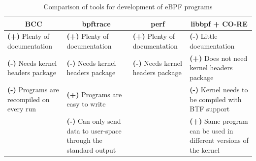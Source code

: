 \begin{table}[htb]
   \centering
   \caption{Comparison of tools for development of eBPF programs}\label{tab:comp}
   \begin{tabular}{|p{3.5cm}|p{3.5cm}|p{3.5cm}|p{3.5cm}|}
      \hline
      \multicolumn{1}{|c|}{\textbf{BCC}} &
        \multicolumn{1}{c|}{\textbf{bpftrace}} &
        \multicolumn{1}{c|}{\textbf{perf}} & \multicolumn{1}{c|}{\textbf{libbpf
        + CO-RE}} \\
      \hline
      \textbf{(+)} Plenty of \newline documentation & \textbf{(+)} Plenty of
        \newline documentation & \textbf{(+)} Plenty of \newline documentation &
        \textbf{(-)} Little \newline documentation \\
      \hline
      \textbf{(-)} Needs kernel \newline headers package & \textbf{(-)} Needs
        kernel \newline headers package & \textbf{(-)} Needs kernel \newline
        headers package & \textbf{(+)} Does not need \newline kernel headers
        \newline package \\
      \hline
      \textbf{(-)} Programs are \newline recompiled on every \newline run &
        \textbf{(+)} Programs are \newline easy to write & & \textbf{(-)} Kernel
        needs to be \newline compiled with \ac{BTF} \newline support \\
      \hline
      & \textbf{(-)} Can only send \newline data to user-space \newline through
        the standard \newline output & & \textbf{(+)} Same program \newline can
        be used in \newline different versions of \newline the kernel \\
      \hline
   \end{tabular}
\end{table}

